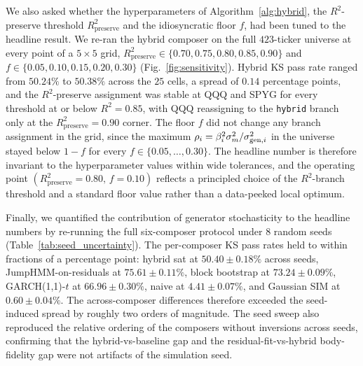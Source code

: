 We also asked whether the hyperparameters of Algorithm~\ref{alg:hybrid},
the $R^2$-preserve threshold $R^2_{\mathrm{preserve}}$ and the
idiosyncratic floor $f$, had been tuned to the headline result. We
re-ran the hybrid composer on the full $423$-ticker universe at every
point of a $5 \times 5$ grid,
$R^2_{\mathrm{preserve}} \in \{0.70, 0.75, 0.80, 0.85, 0.90\}$ and
$f \in \{0.05, 0.10, 0.15, 0.20, 0.30\}$
(Fig.~\ref{fig:sensitivity}). Hybrid KS pass rate ranged from
$50.24\%$ to $50.38\%$ across the $25$ cells, a spread of
$0.14$ percentage points, and the $R^2$-preserve assignment was
stable at QQQ and SPYG for every threshold at or below $R^2 = 0.85$,
with QQQ reassigning to the \texttt{hybrid} branch only at the
$R^2_{\mathrm{preserve}} = 0.90$ corner. The floor $f$ did not change
any branch assignment in the grid, since the maximum
$\rho_i = \beta_i^2 \sigma_m^2 / \sigma_{\mathrm{gen},i}^2$ in the universe
stayed below $1 - f$ for every $f \in \{0.05, \dots, 0.30\}$. The
headline number is therefore invariant to the hyperparameter values
within wide tolerances, and the operating point
$(R^2_{\mathrm{preserve}} = 0.80,\, f = 0.10)$ reflects a principled
choice of the $R^2$-branch threshold and a standard floor value
rather than a data-peeked local optimum.

Finally, we quantified the contribution of generator stochasticity to
the headline numbers by re-running the full six-composer protocol
under $8$ random seeds
(Table~\ref{tab:seed_uncertainty}). The per-composer KS pass rates
held to within fractions of a percentage point: hybrid sat at
$50.40 \pm 0.18\%$ across seeds, JumpHMM-on-residuals at
$75.61 \pm 0.11\%$, block bootstrap at $73.24 \pm 0.09\%$,
GARCH(1,1)-$t$ at $66.96 \pm 0.30\%$, naive at $4.41 \pm 0.07\%$, and
Gaussian SIM at $0.60 \pm 0.04\%$. The across-composer differences
therefore exceeded the seed-induced spread by roughly two orders of
magnitude. The seed sweep also reproduced the relative ordering of
the composers without inversions across seeds, confirming that the
hybrid-vs-baseline gap and the residual-fit-vs-hybrid body-fidelity
gap were not artifacts of the simulation seed.
